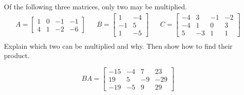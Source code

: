 
\begin{exerciseStatement}


Of the following three matrices, only two may be multiplied. 
\begin{align*} A= \left[\begin{array}{cccc}
1 & 0 & -1 & -1 \\
4 & 1 & -2 & -6
\end{array}\right]  & & B= \left[\begin{array}{cc}
1 & -4 \\
-1 & 5 \\
1 & -5
\end{array}\right]  & & C= \left[\begin{array}{cccc}
-4 & 3 & -1 & -2 \\
-4 & 1 & 0 & 3 \\
5 & -3 & 1 & 1
\end{array}\right]  \\ \end{align*}
             Explain which two can be multiplied and why. Then show how to find their product.


\end{exerciseStatement}
    
\begin{exerciseAnswer} 
\[BA= \left[\begin{array}{cccc}
-15 & -4 & 7 & 23 \\
19 & 5 & -9 & -29 \\
-19 & -5 & 9 & 29
\end{array}\right] \]
\end{exerciseAnswer}
    
